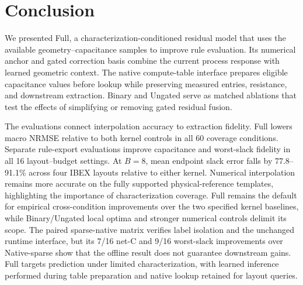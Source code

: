 \documentclass[conference,9pt,letterpaper]{IEEEtran}
\begin{document}
\section{Conclusion}
We presented Full, a characterization-conditioned residual model that uses the available geometry--capacitance samples to improve rule evaluation. Its numerical anchor and gated correction basis combine the current process response with learned geometric context. The native compute-table interface prepares eligible capacitance values before lookup while preserving measured entries, resistance, and downstream extraction. Binary and Ungated serve as matched ablations that test the effects of simplifying or removing gated residual fusion.

The evaluations connect interpolation accuracy to extraction fidelity. Full lowers macro NRMSE relative to both kernel controls in all 60 coverage conditions. Separate rule-export evaluations improve capacitance and worst-slack fidelity in all 16 layout--budget settings. At $B=8$, mean endpoint slack error falls by 77.8--91.1\% across four IBEX layouts relative to either kernel. Numerical interpolation remains more accurate on the fully supported physical-reference templates, highlighting the importance of characterization coverage. Full remains the default for empirical cross-condition improvements over the two specified kernel baselines, while Binary/Ungated local optima and stronger numerical controls delimit its scope. The paired sparse-native matrix verifies label isolation and the unchanged runtime interface, but its 7/16 net-C and 9/16 worst-slack improvements over Native-sparse show that the offline result does not guarantee downstream gains. Full targets prediction under limited characterization, with learned inference performed during table preparation and native lookup retained for layout queries.
\clearpage

\end{document}
